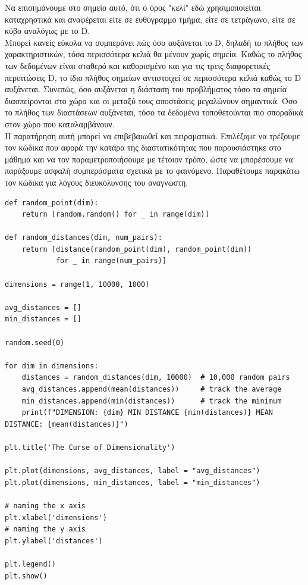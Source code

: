 \documentclass[12pt]{article}
\begin{document}
Να επισημάνουμε στο σημείο αυτό, ότι ο όρος "κελί" εδώ χρησιμοποιείται καταχρηστικά και αναφέρεται είτε σε ευθύγραμμο τμήμα, είτε σε τετράγωνο, είτε σε κύβο αναλόγως με το D. \\

Μπορεί κανείς εύκολα να συμπεράνει πώς όσο αυξάνεται το D, δηλαδή το πλήθος των χαρακτηριστικών, τόσα περισσότερα κελιά θα μένουν χωρίς σημεία. Καθώς το πλήθος των δεδομένων είναι σταθερό και καθορισμένο και για τις τρεις διαφορετικές περιπτώσεις D, το ίδιο πλήθος σημείων αντιστοιχεί σε περισσότερα κελιά καθώς το D αυξάνεται. Συνεπώς, όσο αυξάνεται η διάσταση του προβλήματος τόσο τα σημεία διασπείρονται στο χώρο και οι μεταξύ τους αποστάσεις μεγαλώνουν σημαντικά. Όσο το πλήθος των διαστάσεων αυξάνεται, τόσο τα δεδομένα τοποθετούνται πιο σποραδικά στον χώρο που καταλαμβάνουν. \\

Η παρατήρηση αυτή μπορεί να επιβεβαιωθεί και πειραματικά. Επιλέξαμε να τρέξουμε τον κώδικα που αφορά την κατάρα της διαστατικότητας που παρουσιάστηκε στο μάθημα και να τον παραμετροποιήσουμε με τέτοιον τρόπο, ώστε να μπορέσουμε να παράξουμε ασφαλή συμπεράσματα σχετικά με το φαινόμενο. Παραθέτουμε παρακάτω τον κώδικα για λόγους διευκόλυνσης του αναγνώστη. \\

\begin{lstlisting}
def random_point(dim):
	return [random.random() for _ in range(dim)]

def random_distances(dim, num_pairs):
	return [distance(random_point(dim), random_point(dim))
			for _ in range(num_pairs)]

dimensions = range(1, 10000, 1000)

avg_distances = []
min_distances = []

random.seed(0)

for dim in dimensions:
	distances = random_distances(dim, 10000)  # 10,000 random pairs
	avg_distances.append(mean(distances))     # track the average
	min_distances.append(min(distances))      # track the minimum
	print(f"DIMENSION: {dim} MIN DISTANCE {min(distances)} MEAN DISTANCE: {mean(distances)}")

plt.title('The Curse of Dimensionality')

plt.plot(dimensions, avg_distances, label = "avg_distances")
plt.plot(dimensions, min_distances, label = "min_distances")

# naming the x axis
plt.xlabel('dimensions')
# naming the y axis
plt.ylabel('distances')

plt.legend()
plt.show()
\end{lstlisting}
\end{document}
